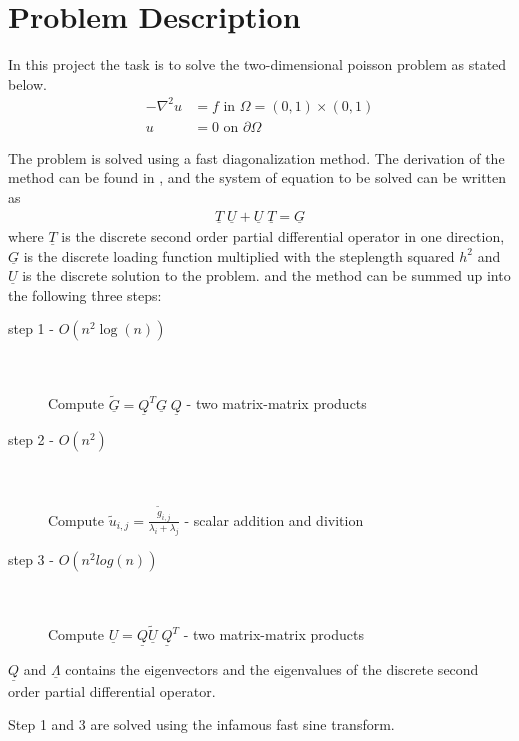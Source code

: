\section{Problem Description}

In this project the task is to solve the two-dimensional poisson problem as stated below.
\begin{align}
	-\nabla^2 u &= f  \text{ in } \Omega = (0,1)\times(0,1) \\
	u &=  0 \text{ on } \partial \Omega
\end{align}

The problem is solved using a fast diagonalization method. The derivation of the method can be found in \cite{poisson} ,
and the system of equation to be solved can be written as 
\begin{align}
	\underline{T} \; \underline{U} + 	\underline{U} \; \underline{T} = \underline{G} 	
	\label{eq:Matrix}
\end{align}
where $\underline{T}$ is the discrete second order partial differential operator in one direction, 
$\underline{G}$ is the discrete loading function multiplied with the steplength squared $h^2$ and $\underline{U}$ is the discrete solution
to the problem.
and the method can be summed up into the following three steps:


\begin{description}
	\item[step 1  -  $O(n^2\log(n))$] \hfill \\ \hfill \\
		Compute $\underline{\tilde{G}} = \underline{Q}^T\underline{G} \; \underline{Q} $    -    two matrix-matrix products 
		\hfill \\
	\item[step 2  -  $O(n^2)$] \hfill \\ \hfill \\
		Compute $\tilde{u}_{i,j} = \frac{\tilde{g}_{i,j}}{\lambda_i+\lambda_j}$    -    scalar addition and divition
		\hfill \\
	\item[step 3  -  $O(n^2log(n))$] \hfill \\ \hfill \\
		Compute $\underline{U} = \underline{Q}\underline{\tilde{U}} \; \underline{Q}^T $    -     two matrix-matrix products 
\end{description}

$\underline{Q}$ and $\underline{\Lambda}$ contains the eigenvectors and the eigenvalues of the discrete 
second order partial differential operator. 

Step 1 and 3 are solved using the infamous fast sine transform.
